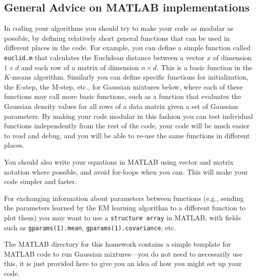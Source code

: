 \documentclass[11pt,psfig]{article}
\begin{document}
\subsection*{General Advice on MATLAB implementations}
In coding your algorithms you should try to make your code as modular as
possible, by defining relatively short general functions that can be used in
different places in the code. For example, you can define a simple function
called {\tt euclid.m} that calculates the Euclidean distance between a  vector
$x$ of dimension $1 \times d$ and each row of a matrix of dimension $n
\times d$. This is a basic function in the $K$-means algorithm. Similarly
you can define specific functions for initialization, the E-step, the M-step,
etc., for Gaussian mixtures below, where each of these functions may call more
basic functions, such as a function that evaluates the Gaussian density values for
all rows of a data matrix given a set of Gaussian parameters. By making your code
modular in this fashion you can test individual functions independently from
the rest of the code, your code will be much easier to read and debug, and you
will be able to re-use the same functions in different places.

You should also write your equations in MATLAB using vector and matrix notation
where possible, and avoid for-loops when you can. This will make your code
simpler and faster.

For exchanging information about parameters between functions (e.g., sending the parameters learned by the EM learning algorithm to a different function to plot them) you may want to use a {\tt structure array} in MATLAB, with fields such as {\tt gparams(1).mean}, {\tt gparams(1).covariance}, etc.

The MATLAB directory for this homework contains a simple
template for MATLAB code to run Gaussian mixtures---you do not need to necessarily use this, it is just provided here to give you an idea of how you might set up your code. 



\end{document}
